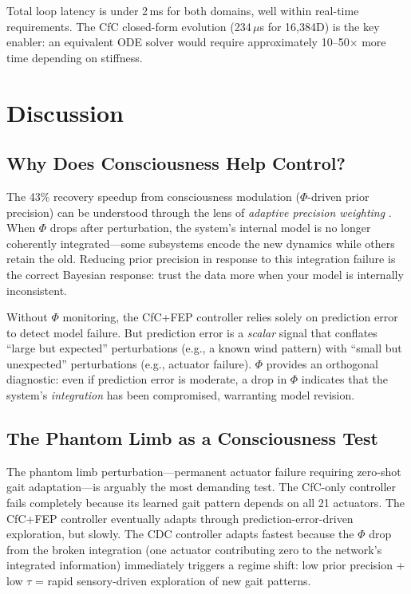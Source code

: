 \documentclass[11pt,a4paper]{article}
\begin{document}
Total loop latency is under 2\,ms for both domains, well within real-time requirements.
The CfC closed-form evolution (234\,$\mu$s for 16,384D) is the key enabler: an equivalent ODE solver would require approximately 10--50$\times$ more time depending on stiffness.

\section{Discussion}
\label{sec:discussion}

\subsection{Why Does Consciousness Help Control?}

The 43\% recovery speedup from consciousness modulation ($\Phi$-driven prior precision) can be understood through the lens of \emph{adaptive precision weighting} \citep{friston2010free, feldman2010attention}.
When $\Phi$ drops after perturbation, the system's internal model is no longer coherently integrated---some subsystems encode the new dynamics while others retain the old.
Reducing prior precision in response to this integration failure is the correct Bayesian response: trust the data more when your model is internally inconsistent.

Without $\Phi$ monitoring, the CfC+FEP controller relies solely on prediction error to detect model failure.
But prediction error is a \emph{scalar} signal that conflates ``large but expected'' perturbations (e.g., a known wind pattern) with ``small but unexpected'' perturbations (e.g., actuator failure).
$\Phi$ provides an orthogonal diagnostic: even if prediction error is moderate, a drop in $\Phi$ indicates that the system's \emph{integration} has been compromised, warranting model revision.

\subsection{The Phantom Limb as a Consciousness Test}

The phantom limb perturbation---permanent actuator failure requiring zero-shot gait adaptation---is arguably the most demanding test.
The CfC-only controller fails completely because its learned gait pattern depends on all 21 actuators.
The CfC+FEP controller eventually adapts through prediction-error-driven exploration, but slowly.
The CDC controller adapts fastest because the $\Phi$ drop from the broken integration (one actuator contributing zero to the network's integrated information) immediately triggers a regime shift: low prior precision + low $\tau$ = rapid sensory-driven exploration of new gait patterns.
\end{document}
